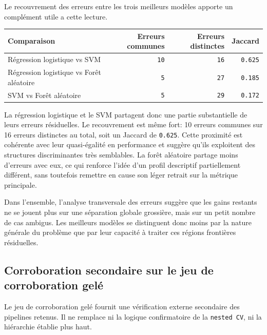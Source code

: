 Le recouvrement des erreurs entre les trois meilleurs modèles apporte un complément utile a cette lecture.

\begin{table}[H]
\centering
\begin{tabular}{|l|r|r|r|}
\hline
\textbf{Comparaison} & \textbf{Erreurs communes} & \textbf{Erreurs distinctes} & \textbf{Jaccard} \\
\hline
Régression logistique vs SVM & \texttt{10} & \texttt{16} & \texttt{0.625} \\
Régression logistique vs Forêt aléatoire & \texttt{5} & \texttt{27} & \texttt{0.185} \\
SVM vs Forêt aléatoire & \texttt{5} & \texttt{29} & \texttt{0.172} \\
\hline
\end{tabular}
\end{table}

La régression logistique et le SVM partagent donc une partie substantielle de leurs erreurs résiduelles. Le recouvrement est même fort: 10 erreurs communes sur 16 erreurs distinctes au total, soit un Jaccard de \texttt{0.625}. Cette proximité est cohérente avec leur quasi-égalité en performance et suggère qu'ils exploitent des structures discriminantes très semblables. La forêt aléatoire partage moins d'erreurs avec eux, ce qui renforce l'idée d'un profil descriptif partiellement différent, sans toutefois remettre en cause son léger retrait sur la métrique principale.

Dans l'ensemble, l'analyse transversale des erreurs suggère que les gains restants ne se jouent plus sur une séparation globale grossière, mais sur un petit nombre de cas ambigus. Les meilleurs modèles se distinguent donc moins par la nature générale du problème que par leur capacité à traiter ces régions frontières résiduelles.

\subsection{Corroboration secondaire sur le jeu de corroboration gelé}
Le jeu de corroboration gelé fournit une vérification externe secondaire des pipelines retenus. Il ne remplace ni la logique confirmatoire de la \texttt{nested CV}, ni la hiérarchie établie plus haut.

